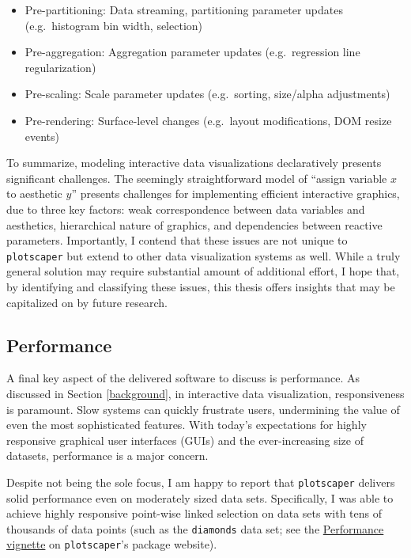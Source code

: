 \documentclass[
  openany]{book}
\providecommand{\tightlist}{%
  \setlength{\itemsep}{0pt}\setlength{\parskip}{0pt}}
\theoremstyle{definition}
\theoremstyle{definition}
\theoremstyle{definition}
\theoremstyle{definition}
\theoremstyle{remark}
\begin{document}
\begin{itemize}
\tightlist
\item
  Pre-partitioning: Data streaming, partitioning parameter updates (e.g.~histogram bin width, selection)
\item
  Pre-aggregation: Aggregation parameter updates (e.g.~regression line regularization)
\item
  Pre-scaling: Scale parameter updates (e.g.~sorting, size/alpha adjustments)
\item
  Pre-rendering: Surface-level changes (e.g.~layout modifications, DOM resize events)
\end{itemize}

To summarize, modeling interactive data visualizations declaratively presents significant challenges. The seemingly straightforward model of ``assign variable \(x\) to aesthetic \(y\)'' presents challenges for implementing efficient interactive graphics, due to three key factors: weak correspondence between data variables and aesthetics, hierarchical nature of graphics, and dependencies between reactive parameters. Importantly, I contend that these issues are not unique to \texttt{plotscaper} but extend to other data visualization systems as well. While a truly general solution may require substantial amount of additional effort, I hope that, by identifying and classifying these issues, this thesis offers insights that may be capitalized on by future research.

\subsection{Performance}\label{performance}

A final key aspect of the delivered software to discuss is performance. As discussed in Section \ref{background}, in interactive data visualization, responsiveness is paramount. Slow systems can quickly frustrate users, undermining the value of even the most sophisticated features. With today's expectations for highly responsive graphical user interfaces (GUIs) and the ever-increasing size of datasets, performance is a major concern.

Despite not being the sole focus, I am happy to report that \texttt{plotscaper} delivers solid performance even on moderately sized data sets. Specifically, I was able to achieve highly responsive point-wise linked selection on data sets with tens of thousands of data points (such as the \texttt{diamonds} data set; see the \href{https://bartonicek.github.io/plotscaper/articles/performance.html}{Performance vignette} on \texttt{plotscaper}'s package website).
\end{document}
